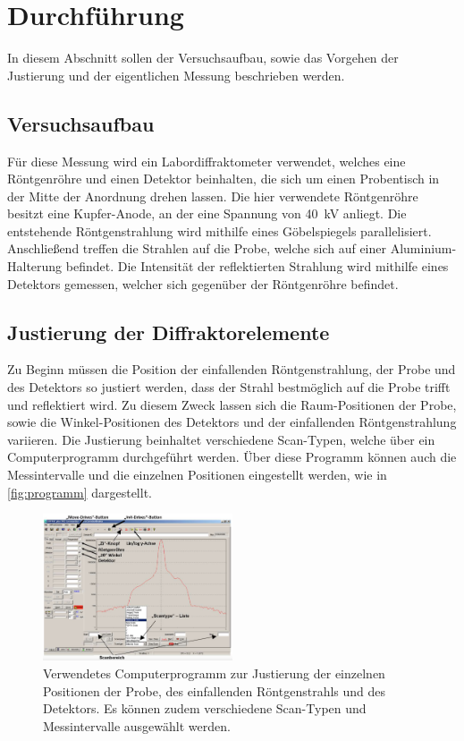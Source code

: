 \section{Durchführung}
\label{sec:durchfuehrung}

In diesem Abschnitt sollen der Versuchsaufbau,
sowie das Vorgehen der Justierung und der eigentlichen Messung beschrieben werden.

\subsection{Versuchsaufbau}

Für diese Messung wird ein Labordiffraktometer verwendet,
welches eine Röntgenröhre und einen Detektor beinhalten,
die sich um einen Probentisch in der Mitte der Anordnung drehen lassen.
Die hier verwendete Röntgenröhre besitzt eine Kupfer-Anode,
an der eine Spannung von \SI{40}{\kilo\volt} anliegt.
Die entstehende Röntgenstrahlung wird mithilfe eines Göbelspiegels parallelisiert.
Anschließend treffen die Strahlen auf die Probe,
welche sich auf einer Aluminium-Halterung befindet.
Die Intensität der reflektierten Strahlung wird mithilfe eines Detektors gemessen,
welcher sich gegenüber der Röntgenröhre befindet.

\subsection{Justierung der Diffraktorelemente}

Zu Beginn müssen die Position der einfallenden Röntgenstrahlung,
der Probe und des Detektors so justiert werden,
dass der Strahl bestmöglich auf die Probe trifft und reflektiert wird.
Zu diesem Zweck lassen sich die Raum-Positionen der Probe,
sowie die Winkel-Positionen des Detektors und der einfallenden Röntgenstrahlung variieren.
Die Justierung beinhaltet verschiedene Scan-Typen,
welche über ein Computerprogramm durchgeführt werden.
Über diese Programm können auch die Messintervalle und die einzelnen Positionen eingestellt werden,
wie in \autoref{fig:programm} dargestellt.
\begin{figure}
    \centering
    \includegraphics[width=0.5\textwidth]{content/img/Abb_2.png}
    \caption{Verwendetes Computerprogramm zur Justierung der einzelnen Positionen der Probe,
    des einfallenden Röntgenstrahls und des Detektors.
    Es können zudem verschiedene Scan-Typen und Messintervalle ausgewählt werden. \cite{versuchsanleitung}}
    \label{fig:programm}
\end{figure}

